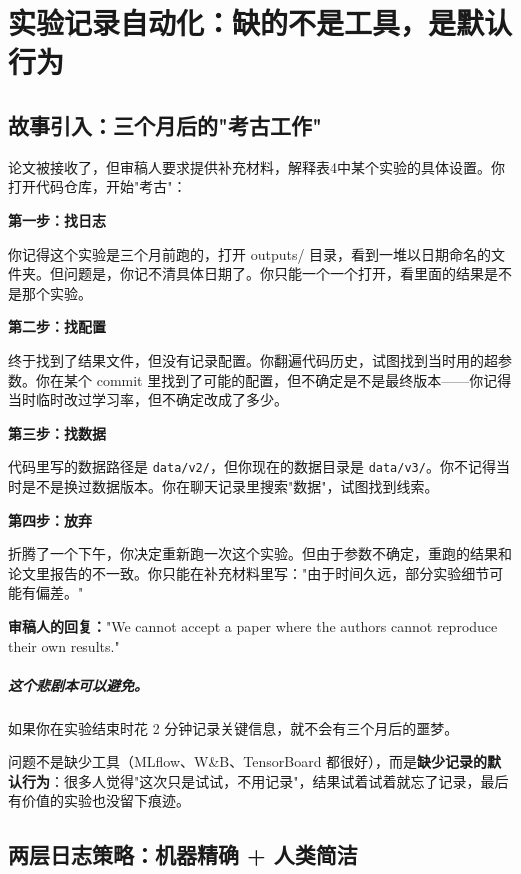 \chapter{实验记录自动化：缺的不是工具，是默认行为}
\label{ch:logging}

\section{故事引入：三个月后的"考古工作"}

论文被接收了，但审稿人要求提供补充材料，解释表4中某个实验的具体设置。你打开代码仓库，开始"考古"：

\textbf{第一步：找日志}

你记得这个实验是三个月前跑的，打开 outputs/ 目录，看到一堆以日期命名的文件夹。但问题是，你记不清具体日期了。你只能一个一个打开，看里面的结果是不是那个实验。

\textbf{第二步：找配置}

终于找到了结果文件，但没有记录配置。你翻遍代码历史，试图找到当时用的超参数。你在某个 commit 里找到了可能的配置，但不确定是不是最终版本——你记得当时临时改过学习率，但不确定改成了多少。

\textbf{第三步：找数据}

代码里写的数据路径是 \texttt{data/v2/}，但你现在的数据目录是 \texttt{data/v3/}。你不记得当时是不是换过数据版本。你在聊天记录里搜索"数据"，试图找到线索。

\textbf{第四步：放弃}

折腾了一个下午，你决定重新跑一次这个实验。但由于参数不确定，重跑的结果和论文里报告的不一致。你只能在补充材料里写："由于时间久远，部分实验细节可能有偏差。"

\textbf{审稿人的回复：}"We cannot accept a paper where the authors cannot reproduce their own results."

\paragraph{这个悲剧本可以避免。}

如果你在实验结束时花 2 分钟记录关键信息，就不会有三个月后的噩梦。

问题不是缺少工具（MLflow、W\&B、TensorBoard 都很好），而是\textbf{缺少记录的默认行为}：很多人觉得"这次只是试试，不用记录"，结果试着试着就忘了记录，最后有价值的实验也没留下痕迹。

\section{两层日志策略：机器精确 + 人类简洁}

